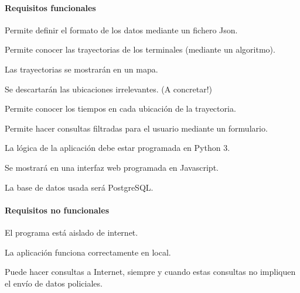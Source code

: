 \paragraph{Requisitos funcionales}

\begin{functional}
        \item Permite definir el formato de los datos mediante un fichero Json.
    
        \item Permite  conocer las trayectorias de los terminales (mediante un algoritmo).
        \begin{functional}
        	\item Las trayectorias se mostrarán en un mapa.
        	\item Se descartarán las ubicaciones irrelevantes. (A concretar!)
        \end{functional}
    	\item Permite conocer los tiempos en cada ubicación de la trayectoria.
        
      \item Permite hacer consultas filtradas para el usuario mediante un formulario.
      
			\item La lógica de la aplicación debe estar programada en Python 3.
			
      \item Se mostrará en una interfaz web programada en Javascript.

    \item La base de datos usada será PostgreSQL.        
\end{functional}

\paragraph{Requisitos no funcionales}

\begin{nonfunctional}
        \item El programa está aislado de internet.
        \begin{nonfunctional}
                \item La aplicación funciona correctamente en local.
                \item Puede hacer consultas a Internet, siempre y cuando estas consultas no impliquen el envío de datos policiales.
        \end{nonfunctional}
\end{nonfunctional}